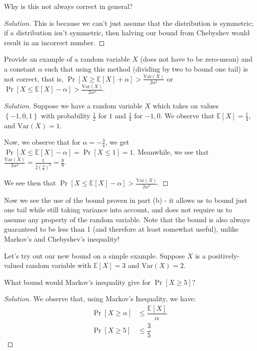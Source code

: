 \documentclass{article}
\newenvironment{solution}{\begin{proof}[Solution]}{\end{proof}}
\newcommand{\E}{\mathbb{E}}
\newcommand{\Var}{\mathrm{Var}}
\newcommand{\var}{\mathrm{Var}}
\begin{document}
\begin{hw}
	Why is this not always correct in general?
\end{hw}
\begin{solution}
	This is because we can't just assume that the distribution is symmetric; if a distribution isn't symmetric, then halving our bound from Chebyshev would result in an incorrect number.
\end{solution}

\newpage

\begin{hw}
	Provide an example of a random variable $X$ (does not have to be zero-mean) and a constant $\alpha$ such that using this method (dividing by two to bound one tail) is not correct,
	that is, $\Pr\left[X \ge \E[X] + \alpha\right] > \frac{\var(X)}{2\alpha^2}$
	or $\Pr\left[X \le \E[X] - \alpha\right] > \frac{\var(X)}{2\alpha^2}$.
\end{hw}
\begin{solution}
	Suppose we have a random variable $X$ which takes on values $\left\{  -1, 0, 1 \right\}$ with probability $\frac{1}{2}$ for $1$ and $\frac{1}{4}$ for $-1, 0$. We observe that $\E[X] = \frac{1}{4}$, and $\Var(X) = 1$.
	
	Now, we observe that for $\alpha = -\frac{3}{4}$, we get $\Pr[X \leq \E[X] - \alpha] = \Pr[X \leq 1] = 1$. Meanwhile, we see that $\frac{\Var(X)}{2\alpha^{2}} = \frac{1}{2\left( \frac{3}{4} \right)^{2}} = \frac{8}{9}$.
	
	We see then that $\Pr[X \leq \E[X] - \alpha] > \frac{\Var(X)}{2\alpha^{2}}$.
\end{solution}

Now we see the use of the bound proven in part (b) - it allows us to bound just one tail while still taking variance into account, and does not 
require us to assume any property of the random variable.
Note that the bound is also always guaranteed to be less than 1 (and therefore at least somewhat useful), unlike Markov's and Chebyshev's inequality!

Let's try out our new bound on a simple example. Suppose $X$ is a positively-valued random variable with $\E[X] = 3$ and $\var(X) = 2$. 

\begin{hw}
	What bound would Markov's inequality give for $\Pr[X \ge 5]$?
\end{hw}
\begin{solution}
	We observe that, using Markov's Inequality, we have:
	\begin{align*}
		\Pr[X \geq \alpha] &\leq \dfrac{\E[X]}{\alpha} \\
		\Pr[X \geq 5] &\leq \dfrac{3}{5}
	\end{align*}
\end{solution}
\end{document}
